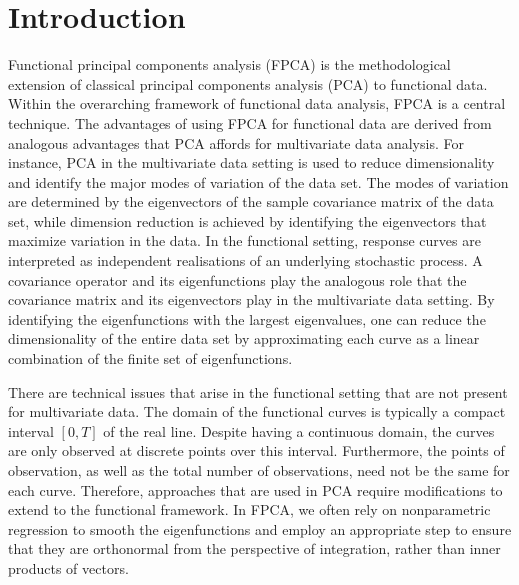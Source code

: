 \documentclass[ba]{imsart}
\numberwithin{equation}{section}
\theoremstyle{plain}
\begin{document}
\begin{frontmatter}
\begin{keyword}[class=MSC]
\end{keyword}

\begin{keyword}
\end{keyword}

\end{frontmatter}


\section{Introduction}
\label{sec:intro}

Functional principal components analysis (FPCA) is the methodological extension of classical principal
components analysis (PCA) to functional data. Within the overarching framework of functional data analysis,
FPCA is a central technique. The advantages of using FPCA for functional data are derived
from analogous advantages that PCA affords for multivariate data analysis. For instance, PCA in the multivariate
data setting is used to reduce dimensionality and identify the major modes of variation of the
data set. The modes of variation are determined by the eigenvectors of the sample covariance matrix of the data
set, while dimension reduction is achieved by identifying the eigenvectors that maximize variation in the data.
In the functional setting, response curves are interpreted as independent realisations of an underlying
stochastic process. A covariance operator and its eigenfunctions play the analogous
role that the covariance matrix and its eigenvectors play in the multivariate data setting. By identifying the
eigenfunctions with the largest eigenvalues, one can reduce the
dimensionality of the entire data set by approximating each curve as a linear combination of the finite set
of eigenfunctions.

There are technical issues that arise in the functional setting that are not present for multivariate data.
The domain of the functional curves is typically a compact interval $[0, T]$ of the real line.
Despite having a continuous domain, the curves are only observed at discrete points over this interval.
Furthermore, the points of observation, as well as the total number of observations, need not be the
same for each curve. Therefore, approaches that are used in PCA require
modifications to extend to the functional framework.
In FPCA, we often rely on nonparametric regression to smooth the eigenfunctions and employ
an appropriate step to ensure that they are orthonormal from the perspective of integration, rather
than inner products of vectors.
\end{document}
